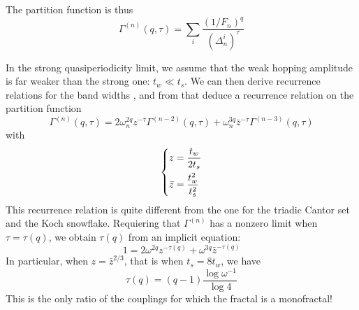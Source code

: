 \documentclass[11pt]{article}
\begin{document}
The partition function is thus
\begin{equation}
	\Gamma^{(n)}(q,\tau) = \sum_i \frac{(1/F_n)^q}{\left(\Delta^i_n\right)^\tau}
\end{equation}

In the strong quasiperiodicity limit, we assume that the weak hopping amplitude is far weaker than the strong one: $t_w \ll t_s$.
We can then derive recurrence relations for the band widths \cite{Piechon95}, and from that deduce a recurrence relation on the partition function
\begin{equation}
	\Gamma^{(n)}(q,\tau) = 2 \omega_n^{2q}z^{-\tau}\Gamma^{(n-2)}(q,\tau) + \omega_n^{3q}\bar{z}^{-\tau}\Gamma^{(n-3)}(q,\tau)
\end{equation}
with
\begin{equation}
	\begin{dcases*}
        z = \frac{t_w}{2 t_s}\\
       \bar{z} = \frac{t_w^2}{t_s^2}
     \end{dcases*}
\end{equation}
This recurrence relation is quite different from the one for the triadic Cantor set and the Koch snowflake. 
Requiering that $\Gamma^{(n)}$ has a nonzero limit when $\tau = \tau(q)$, we obtain $\tau(q)$ from an implicit equation:
\begin{equation}
\boxed{
	1 = 2 \omega^{2q} z^{-\tau(q)} + \omega^{3q} \bar{z}^{-\tau(q)}
}
\end{equation}
In particular, when $z = \bar{z}^{2/3}$, that is when $t_s = 8 t_w$, we have
\begin{equation}
	\tau(q) = (q-1)\frac{\log \omega^{-1}}{\log 4}
\end{equation}
This is the only ratio of the couplings for which the fractal is a monofractal!
{}

\end{document}
